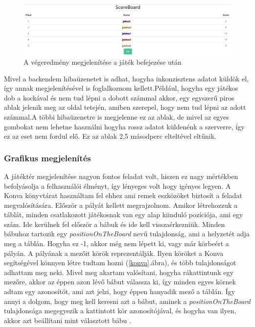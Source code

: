 \documentclass[a4paper,twoside]{article}
\begin{document}
\begin{figure}
	\caption{A végeredmény megjelenítése a játék befejezése után}
	\label{game-end}
	\centering
	\includegraphics[scale=0.32]{game-end}
\end{figure}
\FloatBarrier
Mivel a backendem hibaüzenetet is adhat, hogyha inkonzisztens adatot küldök el, így annak
megjelenítésével is foglalkoznom kellett.Például, hogyha egy játékos dob a kockával és nem tud lépni a dobott számmal akkor, egy egyszerű piros ablak
jelenik meg az oldal tetején, amiben szerepel, hogy nem tud lépni az adott számmal.A többi hibaüzenetre is megjelenne ez az ablak, de mivel az egyes gombokat nem lehetne használni hogyha rossz adatot küldenénk a szerverre, így ez az eset nem fordul elő. Ez az ablak 2,5 másodperc elteltével eltűnik.
\subsubsection{Grafikus megjelenítés}

A játéktér megjelenítése nagyon fontos feladat volt, hiszen ez nagy mértékben befolyásolja a felhasználói élményt, így lényeges volt hogy igényes legyen. A Konva könyvtárat használtam fel ehhez ami remek eszközöket biztosít a feladat megvalósítására. 
Először a pályát kellett megrajzolnom. Amikor létrehozzuk a táblát, minden csatlakozott játékosnak van egy alap kiinduló pozíciója, ami egy szám. Ide kerülnek fel először a bábuk és ide kell visszaérkezniük. Minden bábuhoz tartozik egy \textit{positionOnTheBoard} nevű tulajdonság, ami a helyzetét adja meg a táblán. Hogyha ez -1, akkor még nem lépett ki, vagy már körbeért a pályán. A pályának a mezőit körök reprezentálják. Ilyen köröket a Konva segítségével könnyen létre tudtam hozni (\ref{konva}.ábra), és több tulajdonságot adhattam meg neki. Mivel meg akartam valósítani, hogyha rákattintunk egy mezőre, akkor az éppen azon lévő bábut válassza ki, így minden egyes körnek adtam egy azonosítót, ami azt jelzi, hogy éppen hanyadik mező a táblán. Így annyi a dolgom, hogy meg kell keresni azt a bábut, aminek a \textit{positionOnTheBoard} tulajdonsága megegyezik a kattintott kör azonosítójával, és hogyha van ilyen, akkor azt beállítani mint választott bábu .
\end{document}
